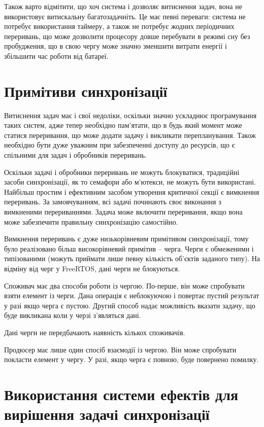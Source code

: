 \documentclass[main.tex]{subfiles}
\begin{document}
Також варто відмітити, що хоч система і дозволяє витиснення задач, вона не використовує витискальну багатозадачніть. Це має певні переваги: система не потребує використання таймеру, а також не потребує жодних періодичних переривань, що може дозволити процесору довше перебувати в режимі сну без пробудження, що в свою чергу може значно зменшити витрати енергії і збільшити час роботи від батареї.

\section{Примітиви синхронізації}

Витиснення задач має і свої недоліки, оскільки значно ускладнює програмування таких систем, адже тепер необхідно пам'ятати, що в будь який момент може статися переривання, що може додати задачу і викликати перепланування. Також необхідно бути дуже уважним при забезпеченні доступу до ресурсів, що є спільними для задач і обробників переривань.

Оскільки задачі і обробники переривань не можуть блокуватися, традиційні засоби синхронізації, як то семафори або м'ютекси, не можуть бути використані. Найбільш простим і ефективним засобом утворення критичної секції є вимкнення переривань. За замовчуванням, всі задачі починають своє виконання з вимкненими перериваннями. Задача може включити переривання, якщо вона може забезпечити правильну синхронізацію самостійно.

Вимкнення переривань є дуже низькорівневим примітивом синхронізації, тому було реалізовано більш високорівневий примітив -- черга. Черги є обмеженими і типізованими (можуть приймати лише певну кількість об'єктів заданого типу). На відміну від черг у FreeRTOS, дані черги не блокуються.

Споживач має два способи роботи із чергою. По-перше, він може спробувати взяти елемент із черги. Дана операція є неблокуючою і повертає пустий результат у разі якщо черга є пустою. Другий способ надає можливість вказати задачу, що буде викликана коли у черзі з'являться дані.

Дані черги не передбачають наявність кількох споживачів.

Продюсер має лише один спосіб взаємодії із чергою. Він може спробувати покласти елемент у чергу. У разі, якщо черга є повною, буде повернено помилку.

\section{\nohyphens{Використання системи ефектів для вирішення задачі синхронізації}}
\end{document}
